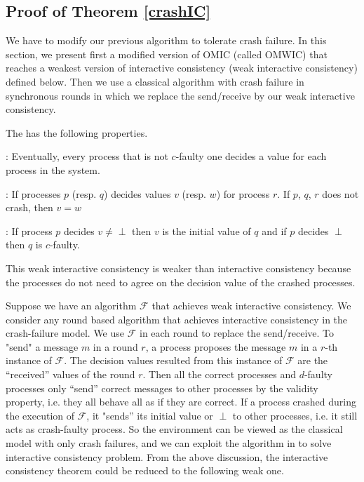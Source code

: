 \subsection{Proof of Theorem \ref{crashIC}}\label{app:thmCrash}


We have to modify our previous algorithm to tolerate crash failure.  
In this section, we present first  a modified version of OMIC (called OMWIC)
that reaches a weakest version of interactive consistency (weak interactive consistency)  
defined below. Then we use a classical algorithm \cite{lamport1982crash,dolev1982polynomial,dwork1990knowledge} with crash failure in synchronous rounds in which we replace the send/receive by our weak interactive consistency.


The  {} has the
following properties.
\begin{itemizedot}
  \item {}: Eventually, every process  that is not $c$-faulty
  one decides a value for each process in the system.
  
  \item {}: If  processes $p$ (resp. $q$) decides values $v$ (resp. $w$)
  for process $r$. If $p$, $q$, $r$ does not crash, then $v=w$
  
  \item {}: If process $p$ decides $v\neq \perp$  then $v$ is the initial value of $q$ and if $p$ decides $\perp$ then $q$  is $c$-faulty.

\end{itemizedot}
This weak interactive consistency  is weaker than interactive consistency because  the  processes do not need to
agree on the decision value of the crashed processes.

Suppose we have an algorithm $\mathcal{F}$ that achieves weak interactive
consistency. 
We consider any round based algorithm that achieves interactive consistency in the crash-failure model.
We use $\mathcal{F}$ in each round to replace the send/receive.
 To "send" a message $m$ in a round $r$, a process proposes the message $m$ in a $r$-th instance of 
 $\mathcal{F}$.
The decision values resulted from this instance of $\mathcal{F}$ are  the ``received'' values of the round $r$.
Then all the correct
processes and $d$-faulty processes only ``send'' correct messages to other
processes by the validity property, i.e. they all  behave all as if they are
correct. If a process crashed during the execution of $\mathcal{F}$, it
"sends'' its initial value or $\perp$ to other processes, i.e. it still acts
as crash-faulty process. So the environment can be viewed as the classical
model with only crash failures, and we can exploit the algorithm in \cite{lamport1982crash,dolev1982polynomial,dwork1990knowledge} to
solve interactive consistency problem. From the above discussion, the
interactive consistency theorem could be reduced to the following weak one.

